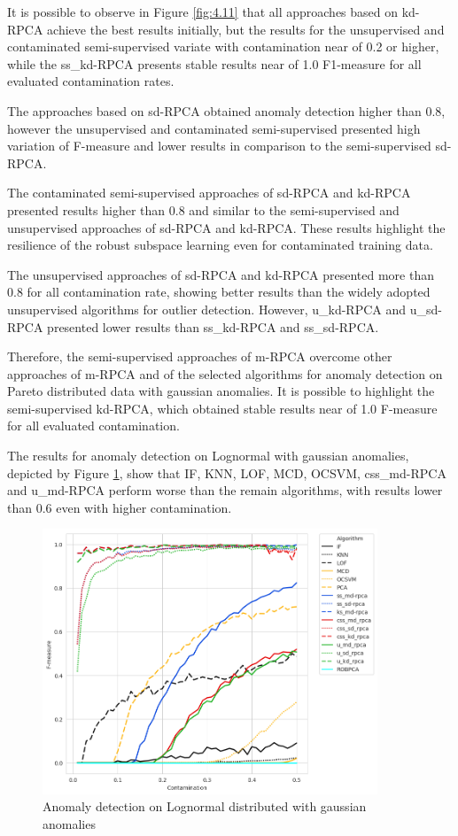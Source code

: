 It is possible to observe in Figure \ref{fig:4.11} that all approaches based on kd-RPCA achieve the best results initially, but the results for the unsupervised and contaminated semi-supervised variate with contamination near of 0.2 or higher, while the ss\_kd-RPCA presents stable results near of 1.0 F1-measure for all evaluated contamination rates.

The approaches based on sd-RPCA obtained anomaly detection higher than 0.8, however the unsupervised and contaminated semi-supervised presented high variation of F-measure and lower results in comparison to the semi-supervised sd-RPCA.

The contaminated semi-supervised approaches of sd-RPCA and kd-RPCA presented results higher than 0.8 and similar to the semi-supervised and unsupervised approaches of sd-RPCA and kd-RPCA. These results highlight the resilience of the robust subspace learning even for contaminated training data.

The unsupervised approaches of sd-RPCA and kd-RPCA presented more than 0.8 for all contamination rate, showing better results than the widely adopted unsupervised algorithms for outlier detection. However, u\_kd-RPCA and u\_sd-RPCA presented lower results than ss\_kd-RPCA and ss\_sd-RPCA.

Therefore, the semi-supervised approaches of m-RPCA overcome other approaches of m-RPCA and of the selected algorithms for anomaly detection on Pareto distributed data with gaussian anomalies. It is possible to highlight the semi-supervised kd-RPCA, which obtained stable results near of 1.0 F-measure for all evaluated contamination.

The results for anomaly detection on Lognormal with gaussian anomalies, depicted by Figure \ref{fig:4.12}, show that IF, KNN, LOF, MCD, OCSVM, css\_md-RPCA and u\_md-RPCA perform worse than the remain algorithms, with results lower than 0.6 even with higher contamination. 

\begin{figure}[h!]
	\centering
	\includegraphics[width=10cm]{figures/ch4/lognormal_f1_contamination.png}
	\caption{Anomaly detection on Lognormal distributed with gaussian anomalies}
	\label{fig:4.12}
\end{figure}

